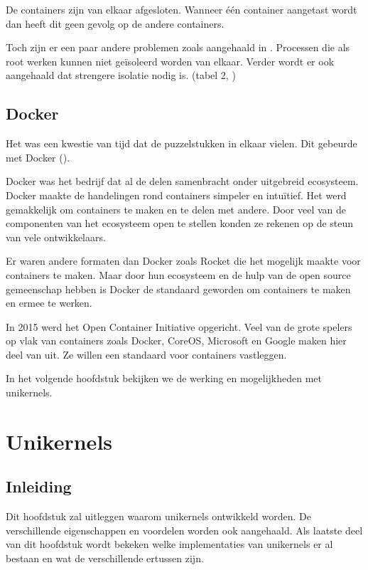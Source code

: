\documentclass[pdftex,a4paper,12pt,twoside]{report}
\begin{document}
De containers zijn van elkaar afgesloten. Wanneer één container aangetast wordt dan heeft dit geen gevolg op de andere containers.

Toch zijn er een paar andere problemen zoals aangehaald in \cite{madhavapeddy_jitsu:_2015}. Processen die als root werken kunnen niet geïsoleerd worden van elkaar. Verder wordt er ook aangehaald dat strengere isolatie nodig is. (tabel 2, \cite{madhavapeddy_jitsu:_2015})

\section{Docker}

Het was een kwestie van tijd dat de puzzelstukken in elkaar vielen. Dit gebeurde met Docker (\cite{docker_docker_2016}). 

Docker was het bedrijf dat al de delen samenbracht onder uitgebreid ecosysteem. Docker maakte de handelingen rond containers simpeler en intuïtief. Het werd gemakkelijk om containers te maken en te delen met andere. Door veel van de componenten van het ecosysteem open te stellen konden ze rekenen op de steun van vele ontwikkelaars.

Er waren andere formaten dan Docker zoals Rocket die het mogelijk maakte voor containers te maken. Maar door hun ecosysteem en de hulp van de open source gemeenschap hebben is Docker de standaard geworden om containers te maken en ermee te werken.

In 2015 werd het Open Container Initiative opgericht. Veel van de grote spelers op vlak van containers zoals Docker, CoreOS, Microsoft en Google maken hier deel van uit. Ze willen een standaard voor containers vastleggen.

In het volgende hoofdstuk bekijken we de werking en mogelijkheden met unikernels.

\chapter{Unikernels}
\label{ch:unikernels}

\section{Inleiding}

Dit hoofdstuk zal uitleggen waarom unikernels ontwikkeld worden. De verschillende eigenschappen en voordelen worden ook aangehaald. Als laatste deel van dit hoofdstuk wordt bekeken welke implementaties van unikernels er al bestaan en wat de verschillende ertussen zijn.
\end{document}
